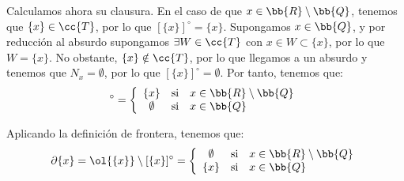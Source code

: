 \begin{ejercicio}
\begin{enumerate}[label=\alph*)]
        Calculamos ahora su clausura. En el caso de que $x\in \bb{R}\setminus \bb{Q}$, tenemos que $\{x\}\in \cc{T}$, por lo que $[\{x\}]^\circ=\{x\}$. Supongamos $x\in \bb{Q}$, y por reducción al absurdo supongamos $\exists W\in \cc{T}$ con $x\in W\subset \{x\}$, por lo que $W=\{x\}$. No obstante, $\{x\}\notin \cc{T}$, por lo que llegamos a un absurdo y tenemos que $N_x=\emptyset$, por lo que $[\{x\}]^\circ=\emptyset$. Por tanto, tenemos que:
        \begin{equation*}
            [\{x\}]^\circ = \left\{\begin{array}{ccl}
                \{x\} & \text{si} & x\in \bb{R}\setminus \bb{Q}\\
                \emptyset & \text{si} & x\in \bb{Q}
            \end{array}\right.
        \end{equation*}

        Aplicando la definición de frontera, tenemos que:
        \begin{equation*}
            \partial \{x\} = \ol{\{x\}}\setminus [\{x\}]^\circ = \left\{\begin{array}{ccl}
                \emptyset & \text{si} & x\in \bb{R}\setminus \bb{Q}\\
                \{x\} & \text{si} & x\in \bb{Q}
            \end{array}\right.
        \end{equation*}
    \end{enumerate}
\end{ejercicio}



